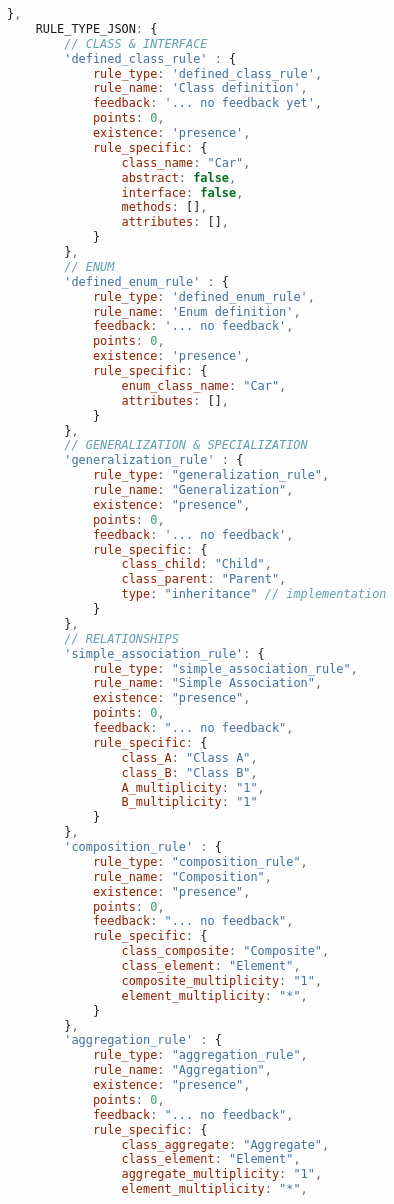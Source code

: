 \begin{lstlisting}[caption={Rules Definition JSON}, label={lst:rules_def}, language=javascript]
    },
    RULE_TYPE_JSON: {
        // CLASS & INTERFACE
        'defined_class_rule' : {
            rule_type: 'defined_class_rule',
            rule_name: 'Class definition',
            feedback: '... no feedback yet',
            points: 0,
            existence: 'presence',
            rule_specific: {
                class_name: "Car",
                abstract: false,
                interface: false,
                methods: [],
                attributes: [],
            }
        },
        // ENUM
        'defined_enum_rule' : {
            rule_type: 'defined_enum_rule',
            rule_name: 'Enum definition',
            feedback: '... no feedback',
            points: 0,
            existence: 'presence',
            rule_specific: {
                enum_class_name: "Car",
                attributes: [],
            }
        },
        // GENERALIZATION & SPECIALIZATION
        'generalization_rule' : {
            rule_type: "generalization_rule",
            rule_name: "Generalization",
            existence: "presence",
            points: 0,
            feedback: '... no feedback',
            rule_specific: {
                class_child: "Child",
                class_parent: "Parent",
                type: "inheritance" // implementation
            }
        },
        // RELATIONSHIPS
        'simple_association_rule': {
            rule_type: "simple_association_rule",
            rule_name: "Simple Association",
            existence: "presence",
            points: 0,
            feedback: "... no feedback",
            rule_specific: {
                class_A: "Class A",
                class_B: "Class B",
                A_multiplicity: "1",
                B_multiplicity: "1"
            }
        },
        'composition_rule' : {
            rule_type: "composition_rule",
            rule_name: "Composition",
            existence: "presence",
            points: 0,
            feedback: "... no feedback",
            rule_specific: {
                class_composite: "Composite",
                class_element: "Element",
                composite_multiplicity: "1",
                element_multiplicity: "*",
            }
        },
        'aggregation_rule' : {
            rule_type: "aggregation_rule",
            rule_name: "Aggregation",
            existence: "presence",
            points: 0,
            feedback: "... no feedback",
            rule_specific: {
                class_aggregate: "Aggregate",
                class_element: "Element",
                aggregate_multiplicity: "1",
                element_multiplicity: "*",

\end{lstlisting}
